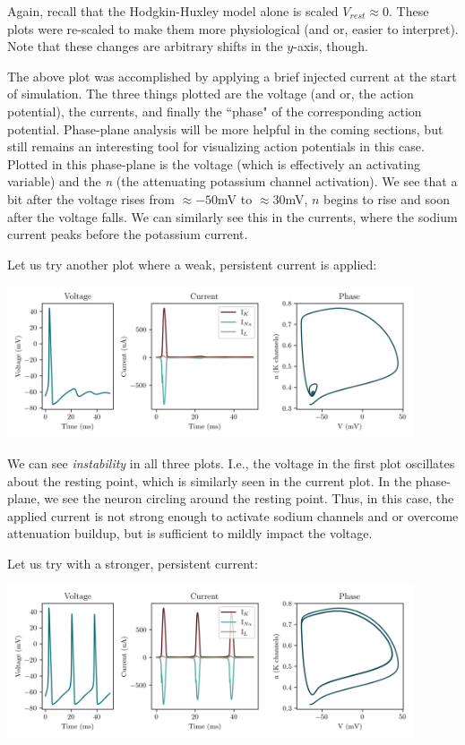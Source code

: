 Again, recall that the Hodgkin-Huxley model alone is scaled $V_{rest} \approx 0$. These plots were re-scaled to make them more physiological (and or, easier to interpret). Note that these changes are arbitrary shifts in the $y$-axis, though.\newline

The above plot was accomplished by applying a brief injected current at the start of simulation. The three things plotted are the voltage (and or, the action potential), the currents, and finally the ``phase" of the corresponding action potential. Phase-plane analysis will be more helpful in the coming sections, but still remains an interesting tool for visualizing action potentials in this case. Plotted in this phase-plane is the voltage (which is effectively an activating variable) and the \textit{n} (the attenuating potassium channel activation). We see that a bit after the voltage rises from $\approx -50$mV to $\approx 30$mV, $n$ begins to rise and soon after the voltage falls. We can similarly see this in the currents, where the sodium current peaks before the potassium current.\newline

Let us try another plot where a weak, persistent current is applied: 

\begin{center}
\includegraphics[width=0.9\textwidth]{images/models/hh2.png}
\end{center}

We can see \textit{instability} in all three plots. I.e., the voltage in the first plot oscillates about the resting point, which is similarly seen in the current plot. In the phase-plane, we see the neuron circling around the resting point. Thus, in this case, the applied current is not strong enough to activate sodium channels and or overcome attenuation buildup, but is sufficient to mildly impact the voltage. 

Let us try with a stronger, persistent current: 

\begin{center}
\includegraphics[width=0.9\textwidth]{images/models/hh3.png}
\end{center}

